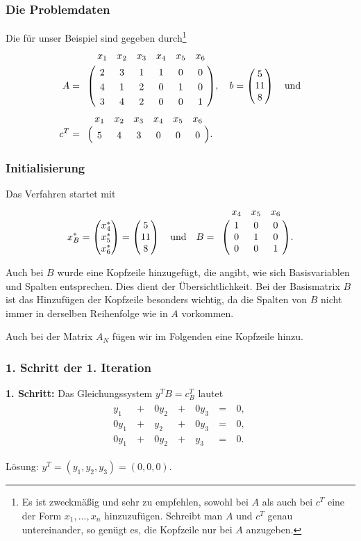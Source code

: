 \documentclass[smaller]{beamer}
\begin{document}
\begin{frame}
 \frametitle{Die Problemdaten}
 Die  für unser Beispiel sind gegeben durch\footnote{Es ist zweckmäßig und sehr zu empfehlen, sowohl bei $A$ als auch bei $c^T$ eine  der Form $x_1,\ldots,x_n$ hinzuzufügen. Schreibt man $A$ und $c^T$ genau untereinander, so genügt es, die Kopfzeile nur bei $A$ anzugeben.}
\begin{align*}
A &= \bordermatrix{ & x_1 & x_2 & x_3 & x_4 & x_5 & x_6 \cr & 2 & 3 & 1 & 1 & 0 & 0 \cr & 4 & 1 & 2 & 0 & 1 & 0 \cr & 3 & 4 & 2 & 0 & 0 & 1},\quad
b = \begin{pmatrix} 5 \\ 11 \\ 8 \end{pmatrix} \quad \text{und} \\ 
c^T &= \bordermatrix{ & x_1 & x_2 & x_3 & x_4 & x_5 & x_6 \cr & 5 & 4 & 3 & 0 & 0 & 0}.
\end{align*}
\end{frame}

\begin{frame}
 \frametitle{Initialisierung}
 Das Verfahren startet mit 
\[
x_B^* = \begin{pmatrix} x_4^* \\ x_5^* \\ x_6^* \end{pmatrix} = \begin{pmatrix} 5 \\ 11 \\ 8 \end{pmatrix} \quad \text{und} \quad
B = \bordermatrix{ & x_4 & x_5 & x_6 \cr & 1 & 0 & 0 \cr & 0 & 1 & 0 \cr & 0 & 0 & 1}.
\]

Auch bei $B$ wurde eine \alert{Kopfzeile} hinzugefügt, die angibt, wie sich Basisvariablen und Spalten entsprechen. Dies dient der Übersichtlichkeit. \alert{Bei der Basismatrix $B$ ist das Hinzufügen der Kopfzeile besonders wichtig}, da die Spalten von $B$ nicht immer in derselben Reihenfolge wie in $A$ vorkommen. \\ \vspace*{0.2cm}

Auch bei der Matrix $A_N$ fügen wir im Folgenden eine Kopfzeile hinzu. 
\end{frame}

\begin{frame}
 \frametitle{1. Schritt der 1. Iteration}
 {\textbf{1. Schritt:}} Das Gleichungssystem $y^TB = c_B^T$ lautet
\begin{align*}
\begin{alignedat}{4}
 y_1 &\ + &\ 0y_2 &\ + &\ 0y_3 &\ = &\ 0,\ \\
0y_1 &\ + &\  y_2 &\ + &\ 0y_3 &\ = &\ 0,\ \\
0y_1 &\ + &\ 0y_2 &\ + &\  y_3 &\ = &\ 0.\ 
\end{alignedat}
\end{align*}

Lösung: $y^T = (y_1,y_2,y_3) = (0,0,0)$.
\end{frame}
\end{document}
